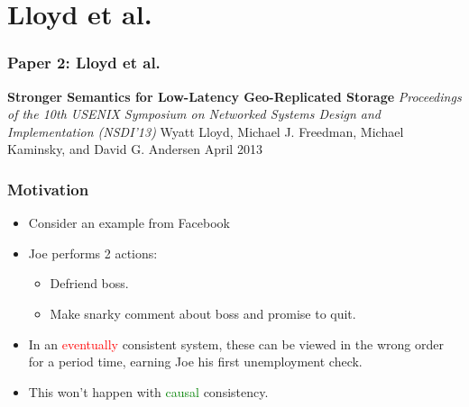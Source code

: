 \documentclass{beamer}
\begin{document}

\section{Lloyd et al.} 

\begin{frame}
\frametitle{Paper 2: Lloyd et al.}

\textbf{Stronger Semantics for Low-Latency Geo-Replicated Storage} \newline
\textit{Proceedings of the 10th USENIX Symposium on Networked Systems Design and Implementation (NSDI’13)} \newline
Wyatt Lloyd, Michael J. Freedman, Michael Kaminsky, and David G. Andersen \newline
April 2013 \newline

\end{frame}

\begin{frame}
\frametitle{Motivation}
\begin{itemize}

\item Consider an example from Facebook
\pause\item Joe performs 2 actions:
	\begin{itemize}
		\pause\item Defriend boss.
		\pause\item Make snarky comment about boss and promise to quit.
	\end{itemize}
\pause\item In an \textcolor{red}{eventually} consistent system, these can be viewed in the wrong order for a period time, earning Joe his first unemployment check.
\pause\item This won't happen with \textcolor{green}{causal} consistency.

\end{itemize}  
\end{frame}
\end{document}
